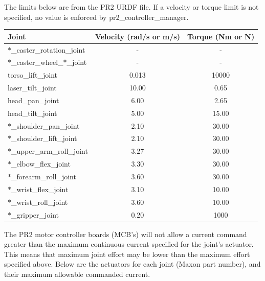 The limits below are from the PR2 URDF file. If a velocity or torque limit is
not specified, no value is enforced by pr2\_controller\_manager.

\begin{tabular}{l*{2}{c}}
Joint  & Velocity (rad/s or m/s) & Torque (Nm or N) \\
\hline \hline
$\ast$\_caster\_rotation\_joint        & -     & -  \\
$\ast$\_caster\_wheel\_$\ast$\_joint   & -     & -  \\
torso\_lift\_joint                     & 0.013 & 10000 \\
laser\_tilt\_joint                     & 10.00 & 0.65  \\
head\_pan\_joint                       & 6.00  & 2.65  \\
head\_tilt\_joint                      & 5.00  & 15.00 \\
$\ast$\_shoulder\_pan\_joint           & 2.10  & 30.00 \\
$\ast$\_shoulder\_lift\_joint          & 2.10  & 30.00 \\
$\ast$\_upper\_arm\_roll\_joint        & 3.27  & 30.00 \\
$\ast$\_elbow\_flex\_joint             & 3.30  & 30.00 \\
$\ast$\_forearm\_roll\_joint           & 3.60  & 30.00 \\
$\ast$\_wrist\_flex\_joint             & 3.10  & 10.00 \\
$\ast$\_wrist\_roll\_joint             & 3.60  & 10.00 \\
$\ast$\_gripper\_joint                 & 0.20  & 1000  \\
\end{tabular}

The PR2 motor controller boards (MCB's) will not allow a current command greater
than the maximum continuous current specified for the joint's actuator. This
means that maximum joint effort may be lower than the maximum effort specified
above. Below are the actuators for each joint (Maxon part number), and their
maximum allowable commanded current.

